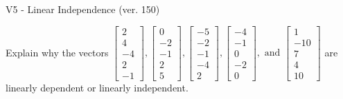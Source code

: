 \begin{exercise}
  \begin{exerciseTitle}V5 - Linear Independence (ver. 150)\end{exerciseTitle}
  \begin{exerciseStatement}
    Explain why the vectors \(\left[\begin{array}{r}
2 \\
4 \\
-4 \\
2 \\
-1
\end{array}\right] , \left[\begin{array}{r}
0 \\
-2 \\
-1 \\
2 \\
5
\end{array}\right] , \left[\begin{array}{r}
-5 \\
-2 \\
-1 \\
-4 \\
2
\end{array}\right] , \left[\begin{array}{r}
-4 \\
-1 \\
0 \\
-2 \\
0
\end{array}\right] , \text{ and } \left[\begin{array}{r}
1 \\
-10 \\
7 \\
4 \\
10
\end{array}\right]\) are linearly dependent or linearly independent.	



\end{exerciseStatement}
\end{exercise}
